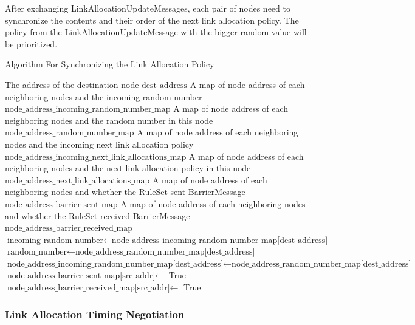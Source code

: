 After exchanging LinkAllocationUpdateMessages, each pair of nodes need to synchronize the contents and their order of the next link allocation policy.
The policy from the LinkAllocationUpdateMessage with the bigger random value will be prioritized.

\begin{algorithm}[H]  
  \begin{minipage}{0.8\linewidth}
  \caption{Algorithm For Synchronizing the Link Allocation Policy}                 
  \begin{algorithmic}[1]
    \Require The address of the destination node $\text{dest\_address}$
    \Require A map of node address of each neighboring nodes and the incoming random number $\text{node\_address\_incoming\_random\_number\_map}$
    \Require A map of node address of each neighboring nodes and the random number in this node $\text{node\_address\_random\_number\_map}$
    \Require  A map of node address of each neighboring nodes and the incoming next link allocation policy $\text{node\_address\_incoming\_next\_link\_allocations\_map}$
    \Require  A map of node address of each neighboring nodes and the next link allocation policy in this node $\text{node\_address\_next\_link\_allocations\_map}$
    \Require  A map of node address of each neighboring nodes and whether the RuleSet sent BarrierMessage $\text{node\_address\_barrier\_sent\_map}$
    \Require  A map of node address of each neighboring nodes and whether the RuleSet received BarrierMessage $\text{node\_address\_barrier\_received\_map}$
    \State $\text{incoming\_random\_number} \gets \text{node\_address\_incoming\_random\_number\_map[dest\_address]}$
    \State $\text{random\_number} \gets \text{node\_address\_random\_number\_map[dest\_address]}$
      \State $\text{node\_address\_incoming\_random\_number\_map[dest\_address]} \gets \text{node\_address\_random\_number\_map[dest\_address]}$
    \EndIf
    \State $\text{node\_address\_barrier\_sent\_map[src\_addr]} \gets$ True
    \State $\text{node\_address\_barrier\_received\_map[src\_addr]} \gets$ True
  \end{algorithmic}
\end{minipage}
\end{algorithm}

\subsubsection{Link Allocation Timing Negotiation}

